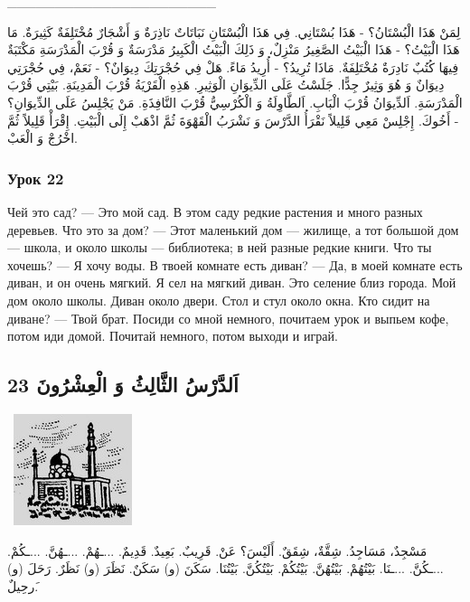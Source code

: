 \documentclass[a5paper]{article}
\begin{document}
\_\_\_\_\_\_\_\_\_\_\_\_\_\_\_\_\_\_\_\_\_\_

لِمَنْ هَذَا الْبُسْتَانُ؟ - هَذَا بُسْتَانِي. فِي هَذَا الْبُسْتَانِ نَبَاتَاتٌ نَاذِرَةٌ وَ أَشْجَارٌ مُخْتَلِفَةٌ كَثِيرَةٌ. مَا هَذَا الْبَيْتُ؟ - هَذَا الْبَيْتُ الصَّغِيرُ مَنْزِلٌ، وَ ذَلِكَ الْبَيْتُ الْكَبِيرُ مَدْرَسَةٌ وَ قُرْبَ الْمَدْرَسَةِ مَكْتَبَةٌ فِيهَا كُتُبٌ نَادِرَةٌ مُخْتَلِفَةٌ. مَاذَا تُرِيدُ؟ - أُرِيدُ مَاءً. هَلْ فِي حُجْرَتِكَ دِيوَانٌ؟ - نَعَمْ، فِي حُجْرَتِي دِيوَانٌ وَ هُوَ وَثِيرٌ جِدًّا. جَلَسْتُ عَلَى الدِّيوَانِ الْوَثِيرِ. هَذِهِ الْقَرْيَةُ قُرْبَ الْمَدِينَةِ. بَيْتِي قُرْبَ الْمَدْرَسَةِ. اَلدِّيوَانُ قُرْبَ الْبَابِ. اَلطَّاوِلَةُ وَ الْكُرْسِيُّ قُرْبَ النَّافِذَةِ. مَنْ يَجْلِسُ عَلَى الدِّيوَانِ؟ - أَخُوكَ. إِجْلِسْ مَعِي قَلِيلاً نَقْرَأُ الدَّرْسَ وَ نَشْرَبُ الْقَهْوَةَ ثُمَّ اذْهَبْ إِلَى الْبَيْتِ. إِقْرَأْ قَلِيلاً ثُمَّ اخْرُجْ وَ الْعَبْ.

\subsubsection{Урок 22}
Чей это сад? — Это мой сад. В этом саду редкие растения и много разных деревьев. Что это за дом? — Этот маленький дом — жилище, а тот большой дом — школа, и около школы — библиотека; в ней разные редкие книги. Что ты хочешь? — Я хочу воды. В твоей комнате есть диван? — Да, в моей комнате есть диван, и он очень мягкий. Я сел на мягкий диван. Это селение близ города. Мой дом около школы. Диван около двери. Стол и стул около окна. Кто сидит на диване? — Твой брат. Посиди со мной немного, почитаем урок и выпьем кофе, потом иди домой. Почитай немного, потом выходи и играй.

\subsection{23 اَلدَّرْسُ الثَّالِثُ وَ الْعِشْرُونَ}
\  \includegraphics[width=1.3646in,height=1.2811in]{images/MuhammadBagauddinprettified-img040.jpg} 

مَسْجِدٌ، مَسَاجِدُ. شِقَّةٌ، شِقَقٌ. أَلَيْسَ؟ عَنْ. قَرِيبٌ. بَعِيدٌ. قَدِيمٌ. ...ـهُمْ. ...ـهُنَّ. ...ـكُمْ. ...ـكُنَّ. ...ـنَا. بَيْتُهُمْ. بَيْتُهُنَّ. بَيْتُكُمْ. بَيْتُكُنَّ. بَيْتُنَا. سَكَنَ (و) سَكَنٌ. نَظَرَ (و) نَظَرٌ. رَحَلَ (و) َرحِيلٌ.
\end{document}
